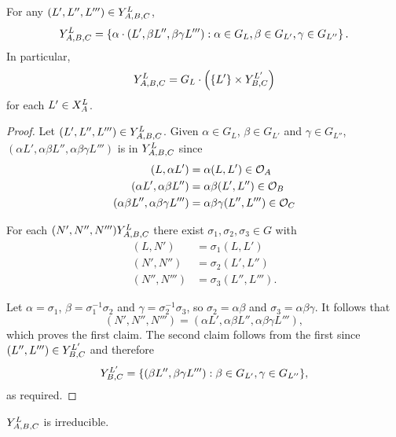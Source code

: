 \documentclass[a4paper, 11pt]{report}
\begin{document}
\begin{lemma}\label{lemma:y-triple-stabilisers}
For any $(L',L'',L''')\in\yprod[L]{A,B,C}$,
\begin{equation*}
\yprod[L]{A,B,C} = \left\{ \alpha\cdot (L',\beta L'',\beta\gamma L'''): \alpha\in G_L, \beta\in G_{L'}, \gamma\in G_{L''}\right\}.
\end{equation*}
In particular,
\begin{equation*}
\yprod[L]{A,B,C} = G_L\cdot\left(\{L'\}\times\yprod[L']{B,C}\right)
\end{equation*}
for each $L'\in\xprod[L]{A}$.
\end{lemma}

\begin{proof}
Let $(L',L'',L''')\in\yprod[L]{A,B,C}$. Given $\alpha\in G_{L}$, $\beta\in G_{L'}$ and $\gamma\in G_{L''}$, $(\alpha L',\alpha\beta L'', \alpha\beta\gamma L''')$ is in $\yprod[L]{A,B,C}$ since
\begin{align*}
(L,\alpha L') &= \alpha (L,L')\in\orbit{A}\\
(\alpha L', \alpha\beta L'') &= \alpha\beta (L',L'')\in\orbit{B}\\
(\alpha\beta L'',\alpha\beta\gamma L''') &= \alpha\beta\gamma (L'',L''')\in\orbit{C}
\end{align*}

For each $(N',N'',N''')\yprod[L]{A,B,C}$ there exist $\sigma_1,\sigma_2,\sigma_3\in G$ with
\begin{align*}
(L,N') &= \sigma_1(L,L')\\
(N',N'') &= \sigma_2(L',L'')\\
(N'',N''') &= \sigma_3(L'',L''').
\end{align*}

Let $\alpha = \sigma_1$, $\beta = \sigma_1^{-1}\sigma_2$ and $\gamma = \sigma_2^{-1}\sigma_3$, so $\sigma_2=\alpha\beta$ and $\sigma_3=\alpha\beta\gamma$. It follows that
\begin{equation*}
(N',N'',N''') = (\alpha L',\alpha\beta L'', \alpha\beta\gamma L'''),
\end{equation*}
which proves the first claim. The second claim follows from the first since $(L'',L''')\in\yprod[L']{B,C}$ and therefore
\begin{equation*}
\yprod[L']{B,C} = \{(\beta L'',\beta\gamma L'''):\beta\in G_{L'}, \gamma\in G_{L''}\},
\end{equation*}
as required.
\end{proof}

\begin{proposition}\label{proposition:irreducible-y-triple}
$\yprod[L]{A,B,C}$ is irreducible.
\end{proposition}
\end{document}
